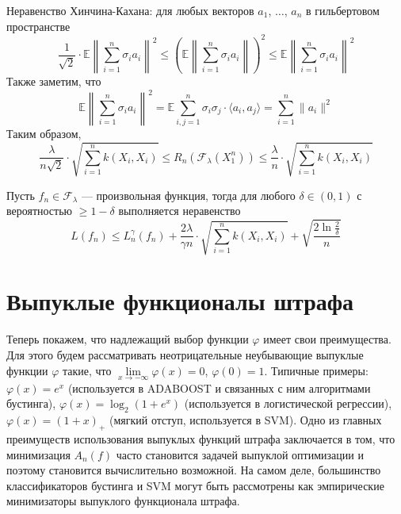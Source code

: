 \documentclass[12pt]{article}
\newtheorem{corollary}{\hskip\parindent Следствие}%
\begin{document}
Неравенство Хинчина-Кахана: для любых векторов $a_1$, $\dots$, $a_n$ в гильбертовом пространстве
\begin{equation*}
	\frac{1}{\sqrt{2}}\cdot\mathbb{E}\left\|\sum\limits_{i=1}^{n}\sigma_ia_i\right\|^2\leqslant\left(\mathbb{E}\left\|\sum\limits_{i=1}^{n}\sigma_ia_i\right\|\right)^2\leqslant\mathbb{E}\left\|\sum\limits_{i=1}^{n}\sigma_ia_i\right\|^2
\end{equation*}
Также заметим, что
\begin{equation*}
	\mathbb{E}\left\|\sum\limits_{i=1}^{n}\sigma_ia_i\right\|^2=\mathbb{E}\sum\limits_{i,j=1}^{n}\sigma_i\sigma_j\cdot\langle a_i,a_j\rangle=\sum\limits_{i=1}^{n}\|a_i\|^2
\end{equation*}
Таким образом,
\begin{equation*}
	\frac{\lambda}{n\sqrt{2}}\cdot\sqrt{\sum\limits_{i=1}^{n}k(X_i,X_i)}\leqslant R_n(\mathcal{F}_\lambda(X_1^n))\leqslant\frac{\lambda}{n}\cdot\sqrt{\sum\limits_{i=1}^{n}k(X_i,X_i)}
\end{equation*}
\begin{corollary}
	Пусть $f_n\in\mathcal{F}_\lambda$ --- произвольная функция, тогда для любого $\delta\in(0,1)$ с вероятностью $\geqslant1-\delta$ выполняется неравенство
	\begin{equation*}
		L(f_n)\leqslant L_n^\gamma(f_n)+\frac{2\lambda}{\gamma n}\cdot\sqrt{\sum\limits_{i=1}^{n}k(X_i,X_i)}+\sqrt{\frac{2\ln\frac{2}{\delta}}{n}}
	\end{equation*}
\end{corollary}
\section{Выпуклые функционалы штрафа}
Теперь покажем, что надлежащий выбор функции $\varphi$ имеет свои преимущества. Для этого будем рассматривать неотрицательные неубывающие выпуклые функции $\varphi$ такие, что $\lim\limits_{x\to-\infty}\varphi(x)=0$, $\varphi(0)=1$. Типичные примеры: $\varphi(x)=e^x$ (используется в ADABOOST и связанных с ним алгоритмами бустинга), $\varphi(x)=\log_2(1+e^x)$ (используется в логистической регрессии), $\varphi(x)=(1+x)_+$ (мягкий отступ, используется в SVM). Одно из главных преимуществ использования выпуклых функций штрафа заключается в том, что минимизация $A_n(f)$ часто становится задачей выпуклой оптимизации и поэтому становится вычислительно возможной. На самом деле, большинство классификаторов бустинга и SVM могут быть рассмотрены как эмпирические минимизаторы выпуклого функционала штрафа.
\end{document}
